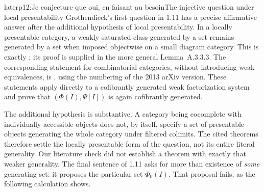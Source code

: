 \begin{dcomment}{later}{p12:Je conjecture que oui, en faisant au besoin}{The injective question under local presentability}
Grothendieck's first question in 1.11 has a precise affirmative answer after the additional hypothesis of local presentability. In a locally presentable category, a weakly saturated class generated by a set remains generated by a set when imposed objectwise on a small diagram category. This is exactly \citet[Lemma~A.2.8.3]{Lurie2009HTT}; its proof is supplied in the more general Lemma~A.3.3.3. The corresponding statement for combinatorial categories, without introducing weak equivalences, is \citet[Corollary~3.4]{MakkaiRosicky2014}, using the numbering of the 2013 arXiv version. These statements apply directly to a cofibrantly generated weak factorization system and prove that $(\Phi(I),\Psi[I])$ is again cofibrantly generated.

The additional hypothesis is substantive. A category being cocomplete with individually accessible objects does not, by itself, specify a set of presentable objects generating the whole category under filtered colimits. The cited theorems therefore settle the locally presentable form of the question, not its entire literal generality. Our literature check did not establish a theorem with exactly that weaker generality. The final sentence of 1.11 asks for more than existence of \emph{some} generating set: it proposes the particular set $\Phi_0(I)$. That proposal fails, as the following calculation shows.
\end{dcomment}

